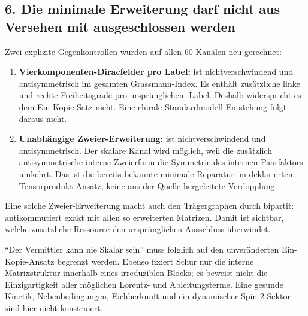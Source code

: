 \subsection{6. Die minimale Erweiterung darf nicht aus Versehen mit
ausgeschlossen
werden}\label{die-minimale-erweiterung-darf-nicht-aus-versehen-mit-ausgeschlossen-werden}

Zwei explizite Gegenkontrollen wurden auf allen 60 Kanälen neu
gerechnet:

\begin{enumerate}
\def\labelenumi{\arabic{enumi}.}
\tightlist
\item
  \textbf{Vierkomponenten-Diracfelder pro Label:} 
  ist nichtverschwindend und antisymmetrisch im gesamten
  Grassmann-Index. Es enthält zusätzliche linke und rechte
  Freiheitsgrade pro ursprünglichem Label. Deshalb widerspricht es dem
  Ein-Kopie-Satz nicht. Eine chirale Standardmodell-Entstehung folgt
  daraus nicht.
\item
  \textbf{Unabhängige Zweier-Erweiterung:}
   ist nichtverschwindend und
  antisymmetrisch. Der skalare Kanal wird möglich, weil die zusätzlich
  antisymmetrische interne Zweierform die Symmetrie des internen
  Paarfaktors umkehrt. Das ist die bereits bekannte minimale Reparatur
  im deklarierten Tensorprodukt-Ansatz, keine aus der Quelle
  hergeleitete Verdopplung.
\end{enumerate}

Eine solche Zweier-Erweiterung macht auch den Trägergraphen durch
 bipartit: 
antikommutiert exakt mit allen so erweiterten Matrizen. Damit ist
sichtbar, welche zusätzliche Ressource den ursprünglichen Ausschluss
überwindet.

``Der Vermittler kann nie Skalar sein'' muss folglich auf den
unveränderten Ein-Kopie-Ansatz begrenzt werden. Ebenso fixiert Schur nur
die interne Matrixstruktur innerhalb eines irreduziblen Blocks; es
beweist nicht die Einzigartigkeit aller möglichen Lorentz- und
Ableitungsterme. Eine gesunde Kinetik, Nebenbedingungen, Eichherkunft
und ein dynamischer Spin-2-Sektor sind hier nicht konstruiert.


